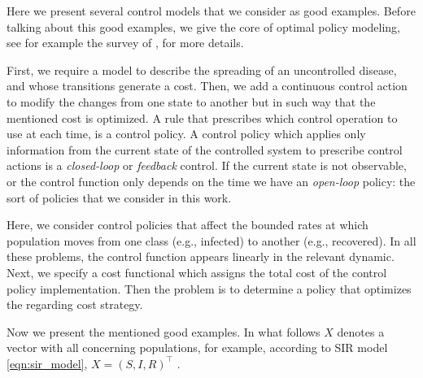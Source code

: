   Here we present  several control models that we consider as good 
examples. Before talking about this good examples, we give the core of optimal 
policy modeling, see for example the survey of \citet{Wickwire1977}, for more
details.

  First, we require a model to describe the spreading of an uncontrolled
disease, and whose transitions generate a cost. Then, we add a continuous
control action to modify the changes from one state to another but in such way
that the mentioned cost is optimized. A rule that prescribes which control
operation to use at each time, is a control policy. A control policy which
applies only information from the current state of the controlled system to
prescribe control actions is a \emph{closed-loop} or \emph{feedback} control.
If the current state is not observable, or the control function only depends 
on the time we have an \emph{open-loop} policy: the sort of policies that we 
consider in this work.

  Here, we consider control policies that affect the bounded rates at which
population moves from one class (e.g., infected) to another (e.g., recovered).
In all these problems, the control function appears linearly in the relevant
dynamic. Next, we specify a cost functional which assigns the total cost of the
control policy implementation. Then the problem is to determine a policy that
optimizes the regarding cost strategy.

  Now we present the mentioned good examples. In what follows $X$ denotes a 
vector with all concerning populations, for example, according to SIR model 
\eqref{eqn:sir_model},  $X=(S, I, R)^\top$ .

